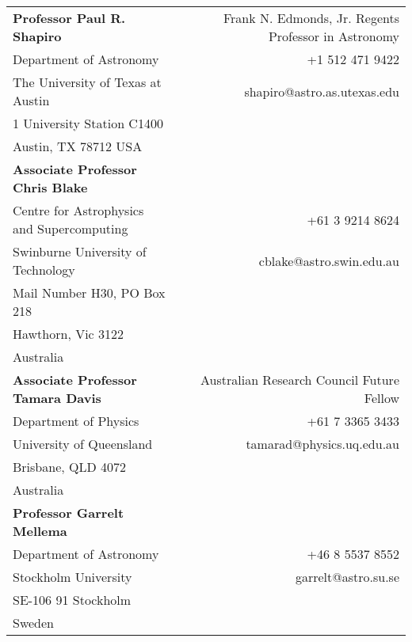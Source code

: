 %
%

\vspace{1.5\baselineskip}

\begin{tabular*}{159.2mm}{@{\extracolsep{\fill}}lr}
\textbf{Professor Paul R. Shapiro} & 
Frank N. Edmonds, Jr. Regents Professor in Astronomy\\
Department of Astronomy            &  +1 512 471 9422\\
The University of Texas at Austin  &  shapiro@astro.as.utexas.edu\\
1 University Station C1400         &  \\
Austin, TX 78712 USA               & \vspace{5mm}\\
%
\textbf{Associate Professor Chris Blake}   & \\
Centre for Astrophysics and Supercomputing & +61 3 9214 8624\\
Swinburne University of Technology         & cblake@astro.swin.edu.au\\
Mail Number H30, PO Box 218                & \\
Hawthorn, Vic 3122                         & \\
Australia                                  & \vspace{5mm}\\
%
\textbf{Associate Professor Tamara Davis}  & 
Australian Research Council Future Fellow \\
Department of Physics                      & +61 7 3365 3433\\
University of Queensland                   & tamarad@physics.uq.edu.au\\
Brisbane, QLD 4072                         & \\
Australia                                  &\vspace{5mm}\\
%
\textbf{Professor Garrelt Mellema} & \\
Department of Astronomy                    & +46 8 5537 8552\\
Stockholm University                       & garrelt@astro.su.se\\
SE-106 91 Stockholm                        &\\
Sweden                                     &\vspace{5mm}\\

\end{tabular*}
